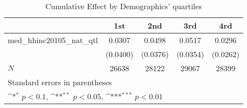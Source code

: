 \begin{table}[htbp]\centering
\def\sym#1{\ifmmode^{#1}\else\(^{#1}\)\fi}
\caption{Cumulative Effect by Demographics' quartiles}
\begin{tabular}{l*{4}{c}}
\hline\hline
            &\multicolumn{1}{c}{1st}&\multicolumn{1}{c}{2nd}&\multicolumn{1}{c}{3rd}&\multicolumn{1}{c}{4rd}\\
\hline
med\_hhinc20105\_nat\_qtl&      0.0307         &      0.0498         &      0.0517         &      0.0296         \\
            &    (0.0400)         &    (0.0376)         &    (0.0354)         &    (0.0262)         \\
\hline
\(N\)       &       26638         &       28122         &       29067         &       28399         \\
\hline\hline
\multicolumn{5}{l}{\footnotesize Standard errors in parentheses}\\
\multicolumn{5}{l}{\footnotesize \sym{*} \(p<0.1\), \sym{**} \(p<0.05\), \sym{***} \(p<0.01\)}\\
\end{tabular}
\end{table}

